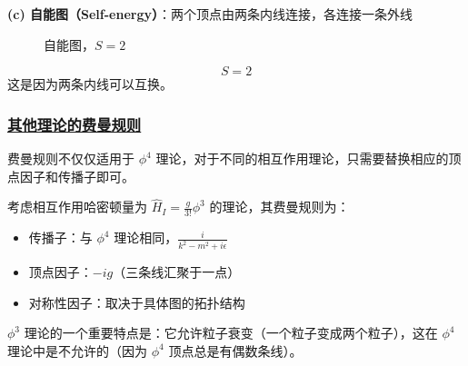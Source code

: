 \begin{example}[对称性因子的计算]
    \textbf{(c) 自能图（Self-energy）}：两个顶点由两条内线连接，各连接一条外线
    \begin{figure}[htbp]
        \centering
        \caption{自能图，$S=2$}
    \end{figure}
    \begin{equation*}
        S = 2
    \end{equation*}
    这是因为两条内线可以互换。
\end{example}

\subsubsection{\protect\hyperlink{:}{其他理论的费曼规则}}

费曼规则不仅仅适用于 $\phi^4$ 理论，对于不同的相互作用理论，只需要替换相应的顶点因子和传播子即可。

\begin{example}[$\phi^3$ 理论]
    考虑相互作用哈密顿量为 $\hat{H}_I = \frac{g}{3!}\phi^3$ 的理论，其费曼规则为：
    \begin{itemize}
        \item 传播子：与 $\phi^4$ 理论相同，$\displaystyle \frac{i}{k^2 - m^2 + i\epsilon}$
        \item 顶点因子：$-ig$（三条线汇聚于一点）
        \item 对称性因子：取决于具体图的拓扑结构
    \end{itemize}

    $\phi^3$ 理论的一个重要特点是：它允许粒子衰变（一个粒子变成两个粒子），这在 $\phi^4$ 理论中是不允许的（因为 $\phi^4$ 顶点总是有偶数条线）。
\end{example}

